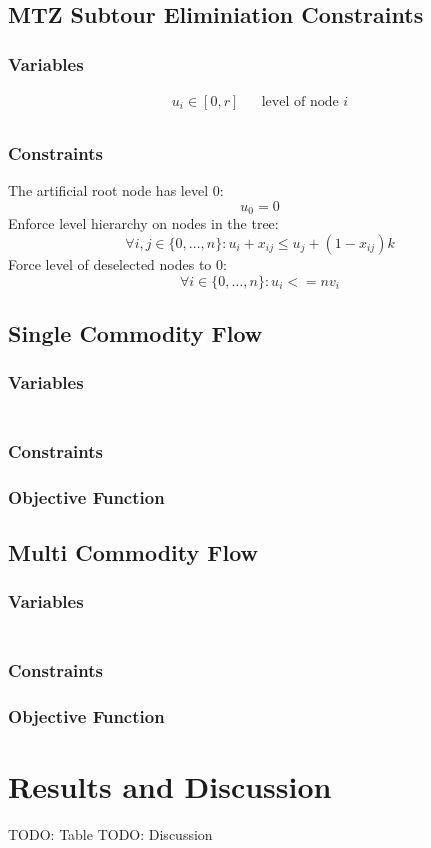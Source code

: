 \documentclass{article}
\begin{document}
\subsection{MTZ Subtour Eliminiation Constraints}
\subsubsection{Variables}
\begin{eqnarray}
u_i \in [0,r]  && \text{level of node $i$} \\
\end{eqnarray}
\subsubsection{Constraints}
The artificial root node has level 0:
\begin{equation}
u_0 = 0
\end{equation}
Enforce level hierarchy on nodes in the tree:
\begin{equation}
\forall i, j \in\{0,\ldots,n\}: u_i + x_{ij} \leq u_j + (1 - x_{ij})k
\end{equation}
Force level of deselected nodes to 0:
\begin{equation}
\forall i \in \{0,\ldots,n\}: u_i <= nv_i
\end{equation}

\subsection{Single Commodity Flow}
\subsubsection{Variables}
\begin{eqnarray}
\end{eqnarray}
\subsubsection{Constraints}
\subsubsection{Objective Function}

\subsection{Multi Commodity Flow}
\subsubsection{Variables}
\begin{eqnarray}
\end{eqnarray}
\subsubsection{Constraints}
\subsubsection{Objective Function}

\section{Results and Discussion}
TODO: Table
TODO: Discussion
\end{document}
